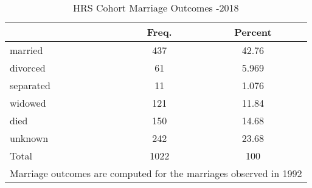 \begin{table}[htbp]\centering
\def\sym#1{\ifmmode^{#1}\else\(^{#1}\)\fi}
\caption{HRS Cohort Marriage Outcomes -2018}
\begin{tabular}{l*{1}{cc}}
\hline\hline
            &       Freq.&     Percent\\
\hline
married     &         437&       42.76\\
divorced    &          61&       5.969\\
separated   &          11&       1.076\\
widowed     &         121&       11.84\\
died        &         150&       14.68\\
unknown     &         242&       23.68\\
Total       &        1022&         100\\
\hline\hline
\multicolumn{3}{l}{\footnotesize Marriage outcomes are computed for the marriages observed in 1992}\\
\end{tabular}
\end{table}
